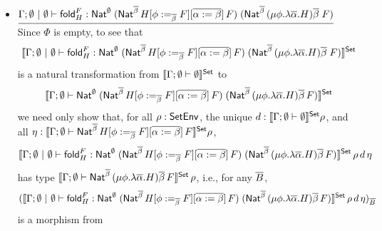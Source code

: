 \documentclass{lmcs}
\theoremstyle{plain}\newtheorem{satz}[thm]{Satz}
\newcommand{\fold}{\mathsf{fold}}
\begin{document}
{\begin{itemize}
\[\begin{array}{ll}
= &
 \relsem{\Gamma;\ol{\beta} \vdash H[\phi := (\mu
    \phi.\lambda {\overline \alpha}.H){\overline \beta}][\ol{\alpha :=
      \beta}]}\Eq_\rho[\ol{\beta := R}]\to\\
 & \hspace*{0.5in} \relsem{\Gamma;\ol{\beta} \vdash (\mu
  \phi.\lambda \ol{\alpha}.H)\ol{\beta}} \Eq_\rho[\ol{\beta:=
    R}]
\end{array}\]
Finally, since $\Phi = \emptyset$, naturality of
\[
\setsem{\Gamma;\emptyset \,|\, \emptyset \vdash \tin_H :
  \Nat^{\ol{\beta}} \, H[\phi := (\mu \phi.\lambda
    {\overline \alpha}.H){\overline \beta}][\ol{\alpha := \beta}]
  \;(\mu \phi.\lambda {\overline \alpha}.H){\overline \beta}}
\]
in $\rho$ is trivial.

\item
$\underline{\Gamma; \emptyset~|~\emptyset \vdash \fold^F_H :
  \Nat^\emptyset\;(\Nat^{\ol{\beta}}\,H[\phi
    :=_{\ol{\beta}} F][\ol{\alpha := \beta}]\,F)\;
  (\Nat^{{\ol{\beta}} }\,(\mu \phi.\lambda \overline
  \alpha.H)\overline \beta \;F)}$ \; Since $\Phi$ is empty, to see
  that 
  $$\setsem{ \Gamma; \emptyset~|~\emptyset \vdash \fold^F_H :
    \Nat^\emptyset\;(\Nat^{\ol{\beta}}\,H[\phi
      :=_{\ol{\beta}} F][\ol{\alpha := \beta}]\,F)\;
    (\Nat^{{\ol{\beta}} }\,(\mu \phi.\lambda \overline
    \alpha.H)\overline \beta \;F)}$$
    is a natural transformation from
  $\llbracket{\Gamma;\emptyset \vdash \emptyset}\rrbracket^{\mathsf{Set}}$ to \[\llbracket{\Gamma;
    \emptyset \vdash \mathsf{Nat}^\emptyset\;(\mathsf{Nat}^{\overline{\beta}}\,H[\phi
      :=_{\overline{\beta}} F][\overline{\alpha := 
        \beta}]\,F)\; (\mathsf{Nat}^{{\overline{\beta}} }\,(\mu
    \phi.\lambda \overline \alpha.H)\overline \beta\,F)}\rrbracket^{\mathsf{Set}}\] we need only
  show that, for all $\rho : \mathsf{SetEnv}$, the unique $d :
  \llbracket{\Gamma;\emptyset \vdash \emptyset}\rrbracket^{\mathsf{Set}} \rho$, and all $\eta :
  \llbracket{\Gamma; \emptyset \vdash \mathsf{Nat}^{\overline{\beta}}\,H[\phi
      :=_{\overline{\beta}} F][\overline{\alpha := 
        \beta}]\,F}\rrbracket^{\mathsf{Set}} \rho$,
\[ \setsem{\Gamma; \emptyset~|~\emptyset \vdash \fold^F_H :
  \Nat^\emptyset\;(\Nat^{\ol{\beta}}\,H[\phi
    :=_{\ol{\beta}} F][\ol{\alpha := \beta}]\,F)\;
  (\Nat^{{\ol{\beta}} }\,(\mu \phi.\lambda \overline
  \alpha.H)\overline \beta\,F)}\,\rho\,d\,\eta\] has type
$\llbracket{\Gamma; \emptyset \vdash \mathsf{Nat}^{{\overline{\beta}}
  }\,(\mu \phi.\lambda \overline \alpha.H)\overline \beta\,F}\rrbracket^{\mathsf{Set}}\,\rho$,
i.e., for any $\overline{B}$,
\[(\setsem{\Gamma; \emptyset~|~\emptyset \vdash \fold^F_H :
  \Nat^\emptyset\;(\Nat^{\ol{\beta}}\,H[\phi :=_{\ol{\beta}}
    F][\ol{\alpha := \beta}]\,F)\; (\Nat^{{\ol{\beta}} }\,(\mu
  \phi.\lambda \overline \alpha.H)\overline
  \beta\,F)}\,\rho\,d\,\eta)_{\ol{B}}\] is a morphism from

\end{itemize}}
\end{document}
